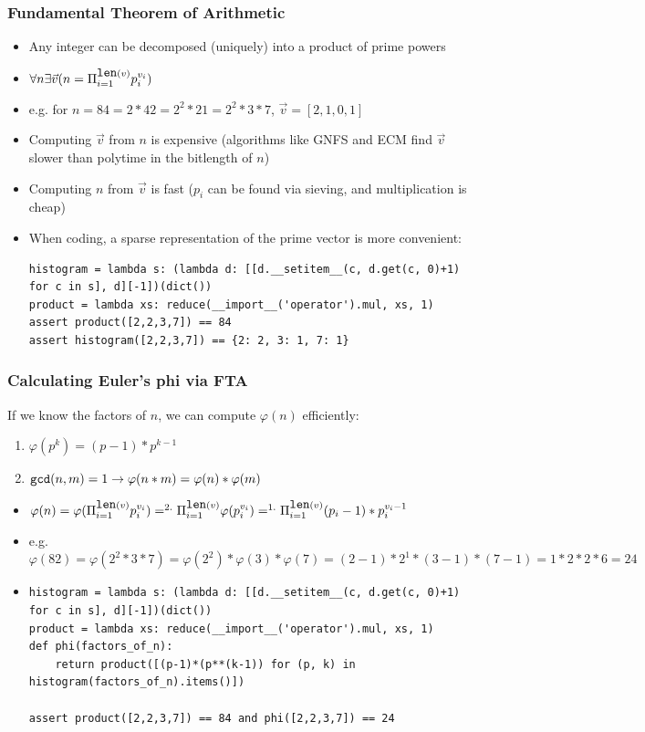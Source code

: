 \documentclass{beamer}
\begin{document}
\begin{frame}[fragile]
\frametitle{Fundamental Theorem of Arithmetic}
\begin{itemize}
\item Any integer can be decomposed (uniquely) into a product of prime powers
\item $\forall n \exists \vec{v} (n = \Pi_{i=1}^{\verb|len|(v)}p_i^{v_i})$
\item e.g. for $n = 84 = 2*42 = 2^2*21 = 2^2 * 3 * 7$, $\vec{v} = [2, 1, 0, 1]$
\item Computing $\vec{v}$ from $n$ is expensive (algorithms like GNFS and ECM find $\vec{v}$ slower than polytime in the bitlength of $n$)
\item Computing $n$ from $\vec{v}$ is fast ($p_i$ can be found via sieving, and multiplication is cheap)
\item When coding, a sparse representation of the prime vector is more convenient:
\begin{Verbatim}[fontsize=\tiny]
histogram = lambda s: (lambda d: [[d.__setitem__(c, d.get(c, 0)+1) for c in s], d][-1])(dict())
product = lambda xs: reduce(__import__('operator').mul, xs, 1)
assert product([2,2,3,7]) == 84
assert histogram([2,2,3,7]) == {2: 2, 3: 1, 7: 1}
\end{Verbatim}
\end{itemize}
\end{frame}

\begin{frame}[fragile]
\frametitle{Calculating Euler's phi via FTA}
If we know the factors of $n$, we can compute $\varphi(n)$ efficiently:
\begin{enumerate}[1.]
\item $\varphi(p^k) = (p - 1)*p^{k-1}$
\item $\verb|gcd|(n, m) = 1 \rightarrow \varphi(n*m) = \varphi(n)*\varphi(m)$
\end{enumerate}
\begin{itemize}
\item {\small $\varphi(n) =
\varphi(\Pi_{i=1}^{\verb|len|(v)}p_i^{v_i}) =^{2.}
\Pi_{i=1}^{\verb|len|(v)}\varphi(p_i^{v_i}) =^{1.}
\Pi_{i=1}^{\verb|len|(v)}(p_i-1)*p_i^{v_i-1}$ }
\item e.g. $\varphi(82) = \varphi(2^2*3*7) = \varphi(2^2)*\varphi(3)*\varphi(7) = (2-1)*2^1*(3-1)*(7-1) = 1*2*2*6 = 24$
\item \begin{Verbatim}[fontsize=\tiny]
histogram = lambda s: (lambda d: [[d.__setitem__(c, d.get(c, 0)+1) for c in s], d][-1])(dict())
product = lambda xs: reduce(__import__('operator').mul, xs, 1)
def phi(factors_of_n):
    return product([(p-1)*(p**(k-1)) for (p, k) in histogram(factors_of_n).items()])

assert product([2,2,3,7]) == 84 and phi([2,2,3,7]) == 24
\end{Verbatim}
\end{itemize}
\end{frame}
\end{document}
